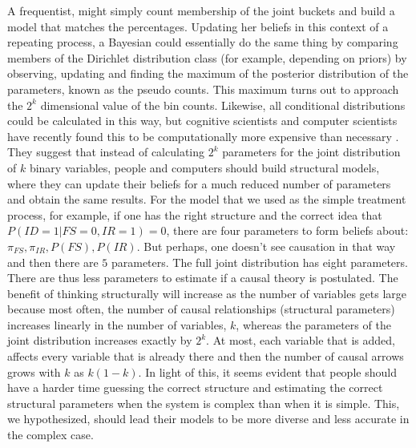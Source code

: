 A frequentist, might simply count membership of the joint buckets and build a model that matches the percentages. Updating her beliefs in this context of a repeating process, a Bayesian could essentially do the same thing by comparing members of the Dirichlet distribution class (for example, depending on priors) by observing, updating and finding the maximum of the posterior distribution of the parameters, known as the pseudo counts. This maximum turns out to approach the $2^k$ dimensional value of the bin counts. Likewise, all conditional distributions could be calculated in this way, but cognitive scientists and computer scientists have recently found this to be computationally more expensive than necessary \citep{Griffith08, Koller03}.  They suggest that instead of calculating $2^k$ parameters for the joint distribution of $k$ binary variables, people and computers should build structural models, where they can update their beliefs for a much reduced number of parameters and obtain the same results. For the model that we used as the simple treatment process, for example, if one has the right structure and the correct idea that $P(ID=1|FS=0, IR=1)=0$, there are four parameters to form beliefs about: $\pi_{FS}, \pi_{IR}, P(FS), P(IR)$. But perhaps, one doesn't see causation in that way and then there are $5$ parameters.  The full joint distribution has eight parameters.  There are thus less parameters to estimate if a causal theory is postulated. The benefit of thinking structurally will increase as the number of variables gets large because most often, the number of causal relationships (structural parameters) increases linearly in the number of variables, $k$, whereas the parameters of the joint distribution increases exactly by $2^k$.  At most, each variable that is added, affects every variable that is already there and then the number of causal arrows grows with $k$ as $k(1-k)$. In light of this, it seems evident that people should have a harder time guessing the correct structure and estimating the correct structural parameters when the system is complex than when it is simple. This, we hypothesized, should lead their models to be more diverse and less accurate in the complex case. 

